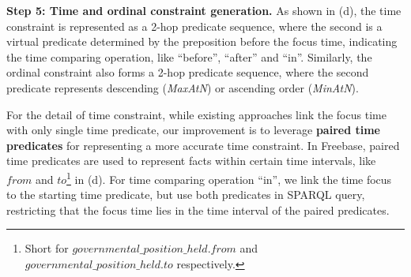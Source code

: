 \textbf{Step 5: Time and ordinal constraint generation.}
As shown in (d), the time constraint is represented
as a 2-hop predicate sequence, 
where the second is a virtual predicate determined by the preposition before the focus time,
indicating the time comparing operation, like ``before'', ``after'' and ``in''.
Similarly, the ordinal constraint also forms a 2-hop predicate sequence,
where the second predicate represents descending (\textit{MaxAtN}) 
or ascending order (\textit{MinAtN}).

For the detail of time constraint,
while existing approaches \cite{yih2015semantic,bao2016constraint} 
link the focus time with only single time predicate,
our improvement is to leverage \textbf{paired time predicates}
for representing a more accurate time constraint.
In Freebase, paired time predicates are used to represent facts within certain time intervals,
like $from$ and $to$\footnote{
Short for $governmental\_position\_held.from$ and $governmental\_position\_held.to$
respectively.} in (d). 
For time comparing operation ``in'', we link the time focus to the starting time predicate,
but use both predicates in SPARQL query,
restricting that the focus time lies in the time interval of the paired predicates.

%

